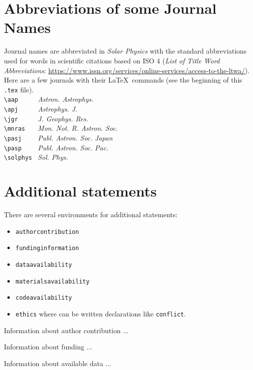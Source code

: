 \documentclass[namedreferences,hyperref,optionalrh]{spr-sola}
\newcommand{\aap}{{\it Astron. Astrophys.}}
\newcommand{\apj}{{\it Astrophys. J.}}
\newcommand{\jgr}{{\it J. Geophys. Res.}}
\newcommand{\mnras}{{\it Mon. Not. R. Astron. Soc.}}
\newcommand{\pasp}{{\it Publ. Astron. Soc. Pac.}}
\newcommand{\pasj}{{\it Publ. Astron. Soc. Japan}}
\newcommand{\solphys}{{\it Sol. Phys.}}
\begin{document}
\section{Abbreviations of some Journal Names} %
\label{S-appendix}
Journal names are abbreviated in {\it Solar Physics} 
with the standard abbreviations used for words in scientific citations based on ISO 4 
({\it List of Title Word Abbreviations}: \url{ https://www.issn.org/services/online-services/access-to-the-ltwa/}). 
Here are a few journals with their \LaTeX\ commands (see the beginning of this \texttt{.tex} file).\\
  \verb+\aap     + \aap \\
  \verb+\apj     + \apj \\
  \verb+\jgr     + \jgr \\
  \verb+\mnras   + \mnras \\
  \verb+\pasj    + \pasj \\
  \verb+\pasp    + \pasp \\
  \verb+\solphys + \solphys 


\section{Additional statements}

There are several environments for additional statements: 
\begin{itemize}
\item \texttt{authorcontribution}
\item \texttt{fundinginformation}
\item \texttt{dataavailability}
\item \texttt{materialsavailability}
\item \texttt{codeavailability}
\item \texttt{ethics} where can be written declarations like \texttt{conflict}.
\end{itemize}
 
 
\begin{authorcontribution}
Information about author contribution ...
\end{authorcontribution}

\begin{fundinginformation}
Information about funding ...
\end{fundinginformation}

\begin{dataavailability}
Information about available data ...
\end{dataavailability}
\end{document}
